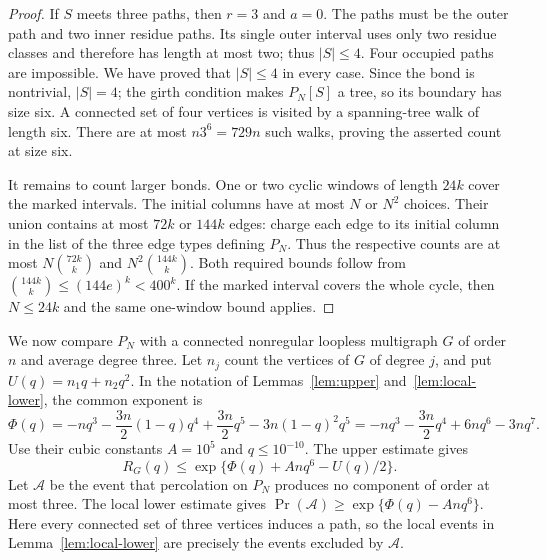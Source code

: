 \documentclass[11pt,reqno]{amsart}
\theoremstyle{remark}
\numberwithin{equation}{section}
\begin{document}
\begin{proof}
If $S$ meets three paths, then $r=3$ and $a=0$. The paths must be
the outer path and two inner residue paths. Its single outer interval
uses only two residue classes and therefore has length at most two;
thus $|S|\le4$. Four occupied paths are impossible. We have proved
that $|S|\le4$ in every case. Since the bond is nontrivial, $|S|=4$;
the girth condition makes $P_N[S]$ a tree, so its boundary has size
six. A connected set of four vertices is visited by a spanning-tree
walk of length six. There are at most $n3^6=729n$ such walks, proving
the asserted count at size six.

It remains to count larger bonds. One or two cyclic windows of length
$24k$ cover the marked intervals. The initial columns have at most
$N$ or $N^2$ choices. Their union contains at most $72k$ or $144k$
edges: charge each edge to its initial column in the list of the
three edge types defining $P_N$. Thus the respective counts are at
most $N\binom{72k}{k}$ and $N^2\binom{144k}{k}$. Both required bounds
follow from $\binom{144k}{k}\le(144e)^k<400^k$. If the marked interval
covers the whole cycle, then $N\le24k$ and the same one-window bound
applies.
\end{proof}

We now compare $P_N$ with a connected nonregular loopless multigraph
$G$ of order $n$ and average degree three. Let $n_j$ count the vertices
of $G$ of degree $j$, and put $U(q)=n_1q+n_2q^2$. In the notation
of Lemmas~\ref{lem:upper} and~\ref{lem:local-lower}, the common exponent is
\begin{equation}\label{eq:cubic-phi}
 \Phi(q)=-nq^3-\frac{3n}{2}(1-q)q^4
       +\frac{3n}{2}q^5-3n(1-q)^2q^5
       =-nq^3-\frac{3n}{2}q^4+6nq^6-3nq^7.
\end{equation}
Use their cubic constants $A=10^5$ and $q\le10^{-10}$. The upper
estimate gives
\begin{equation}\label{eq:cubic-upper}
 R_G(q)\le \exp\{\Phi(q)+Anq^6-U(q)/2\}.
\end{equation}
Let $\mathcal A$ be the event that percolation on $P_N$ produces no
component of order at most three. The local lower estimate gives
$\Pr(\mathcal A)\ge\exp\{\Phi(q)-Anq^6\}$. Here every connected
set of three vertices induces a path, so the local events in
Lemma~\ref{lem:local-lower} are precisely the events excluded by
$\mathcal A$.
\end{document}
